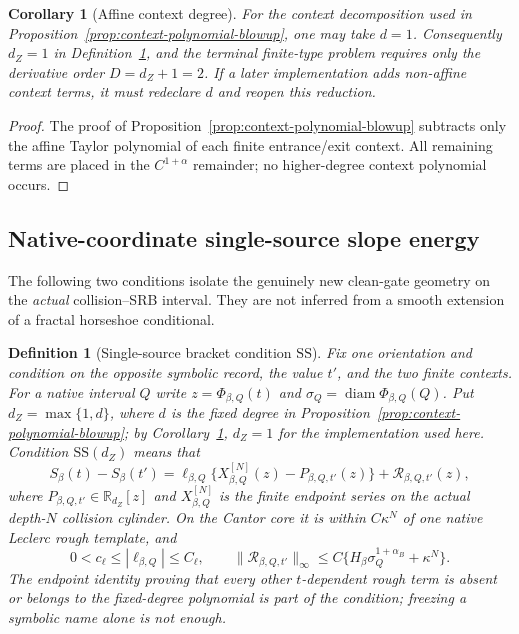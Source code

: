 \documentclass[11pt]{article}
\newtheorem{corollary}[theorem]{Corollary}
\newtheorem{definition}[theorem]{Definition}
\begin{document}
\begin{corollary}[Affine context degree]
\label{cor:affine-context-degree}
For the context decomposition used in
Proposition~\ref{prop:context-polynomial-blowup}, one may take $d=1$.
Consequently $d_Z=1$ in
Definition~\ref{def:single-source-condition}, and the terminal finite-type
problem requires only the derivative order $D=d_Z+1=2$.  If a later
implementation adds non-affine context terms, it must redeclare $d$ and
reopen this reduction.
\end{corollary}

\begin{proof}
The proof of Proposition~\ref{prop:context-polynomial-blowup} subtracts only
the affine Taylor polynomial of each finite entrance/exit context.  All
remaining terms are placed in the $C^{1+\alpha}$ remainder; no higher-degree
context polynomial occurs.
\end{proof}

\subsection{Native-coordinate single-source slope energy}

The following two conditions isolate the genuinely new clean-gate geometry
on the \emph{actual} collision--SRB interval.  They are not inferred from a
smooth extension of a fractal horseshoe conditional.

\begin{definition}[Single-source bracket condition $\mathrm{SS}$]
\label{def:single-source-condition}
Fix one orientation and condition on the opposite symbolic record, the value
$t'$, and the two finite contexts.  For a native interval $Q$ write
$z=\Phi_{\beta,Q}(t)$ and
$\sigma_Q=\operatorname{diam}\Phi_{\beta,Q}(Q)$.  Put
$d_Z=\max\{1,d\}$, where $d$ is
the fixed degree in Proposition~\ref{prop:context-polynomial-blowup}; by
Corollary~\ref{cor:affine-context-degree}, $d_Z=1$ for the implementation
used here.
Condition $\mathrm{SS}(d_Z)$ means that
\begin{equation}
\label{eq:exact-reduced-slope}
 S_\beta(t)-S_\beta(t')
 =\ell_{\beta,Q}\{X^{[N]}_{\beta,Q}(z)-P_{\beta,Q,t'}(z)\}
  +\mathcal R_{\beta,Q,t'}(z),
\end{equation}
where $P_{\beta,Q,t'}\in\mathbb R_{d_Z}[z]$ and
$X^{[N]}_{\beta,Q}$ is the finite endpoint series on the actual depth-$N$
collision cylinder.  On the Cantor core it is within $C\kappa^N$ of one
native Leclerc rough template, and
\begin{equation}
\label{eq:single-source-coefficient}
 0<c_\ell\le|\ell_{\beta,Q}|\le C_\ell,
 \qquad
 \|\mathcal R_{\beta,Q,t'}\|_\infty
 \le C\{H_\beta\sigma_Q^{1+\alpha_B}+\kappa^N\}.
\end{equation}
The endpoint identity proving that every other $t$-dependent rough term is
absent or belongs to the fixed-degree polynomial is part of the condition;
freezing a symbolic name alone is not enough.
\end{definition}
\end{document}

